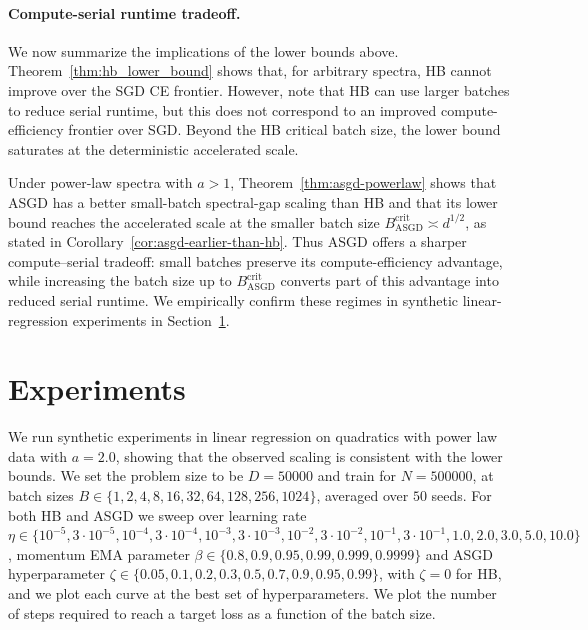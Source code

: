 \documentclass{article}
\begin{document}
\paragraph{Compute-serial runtime tradeoff.} We now summarize the implications of the lower bounds above. Theorem~\ref{thm:hb_lower_bound} shows that, for arbitrary spectra, HB cannot improve over the SGD CE frontier. However, note that HB can use larger batches to reduce
serial runtime, but this does not correspond to an improved compute-efficiency
frontier over SGD. Beyond the HB critical batch size, the lower bound
saturates at the deterministic accelerated scale. 

Under power-law spectra with \(a>1\), Theorem~\ref{thm:asgd-powerlaw}
shows that ASGD has a better small-batch spectral-gap scaling than HB and that
its lower bound reaches the accelerated scale at the smaller batch size
\(B_{\mathrm{ASGD}}^{\mathrm{crit}}\asymp d^{1/2}\), as stated in
Corollary~\ref{cor:asgd-earlier-than-hb}. Thus ASGD offers a sharper
compute--serial tradeoff: small batches preserve its compute-efficiency
advantage, while increasing the batch size up to
\(B_{\mathrm{ASGD}}^{\mathrm{crit}}\) converts part of this advantage into
reduced serial runtime. We empirically confirm these regimes in synthetic
linear-regression experiments in Section~\ref{sec:experiments}.
\section{Experiments}
\label{sec:experiments}

We run synthetic experiments in linear regression on quadratics with power law data with $a = 2.0$, showing that the observed scaling is consistent with the lower bounds. We set the problem size to be $D=50000$ and train for $N = 500000$, at batch sizes $B \in \{1, 2, 4, 8, 16, 32, 64, 128, 256, 1024\}$, averaged over $50$ seeds. For both HB and ASGD we sweep over learning rate $\eta \in \{10^{-5}, 3\cdot 10^{-5}, 10^{-4}, 3\cdot 10^{-4}, 10^{-3}, 3\cdot 10^{-3}, 10^{-2}, 3\cdot 10^{-2}, 10^{-1}, 3\cdot 10^{-1}, 1.0, 2.0, 3.0, 5.0, 10.0\}$, momentum EMA parameter $\beta \in \{0.8, 0.9, 0.95, 0.99, 0.999, 0.9999\}$ and ASGD hyperparameter $\zeta \in \{0.05, 0.1, 0.2, 0.3, 0.5, 0.7, 0.9, 0.95, 0.99\}$, with $\zeta = 0$ for HB, and we plot each curve at the best set of hyperparameters. We plot the number of steps required to reach a target loss as a function of the batch size. 
\end{document}
